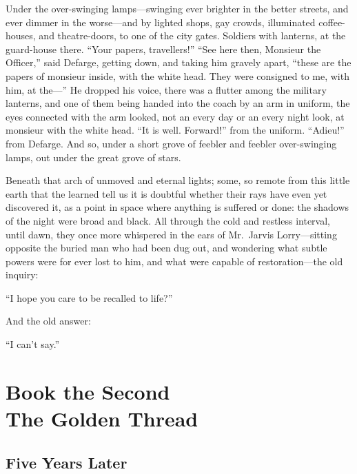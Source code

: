 Under the over-swinging lamps---swinging ever brighter in the better
streets, and ever dimmer in the worse---and by lighted shops, gay
crowds, illuminated coffee-houses, and theatre-doors, to one of the
city gates.  Soldiers with lanterns, at the guard-house there.
``Your papers, travellers!''  ``See here then, Monsieur the Officer,''
said Defarge, getting down, and taking him gravely apart, ``these are
the papers of monsieur inside, with the white head.  They were
consigned to me, with him, at the---'' He dropped his voice, there was
a flutter among the military lanterns, and one of them being handed
into the coach by an arm in uniform, the eyes connected with the arm
looked, not an every day or an every night look, at monsieur with the
white head.  ``It is well.  Forward!'' from the uniform.  ``Adieu!'' from
Defarge.  And so, under a short grove of feebler and feebler
over-swinging lamps, out under the great grove of stars.

Beneath that arch of unmoved and eternal lights; some, so remote from
this little earth that the learned tell us it is doubtful whether
their rays have even yet discovered it, as a point in space where
anything is suffered or done:  the shadows of the night were broad and
black.  All through the cold and restless interval, until dawn, they
once more whispered in the ears of Mr.\ Jarvis Lorry---sitting opposite
the buried man who had been dug out, and wondering what subtle powers
were for ever lost to him, and what were capable of restoration---the
old inquiry:

``I hope you care to be recalled to life?''

And the old answer:

``I can't say.''







\cleartorecto
\part{Book the Second\\The Golden Thread}



\chapter{Five Years Later}


